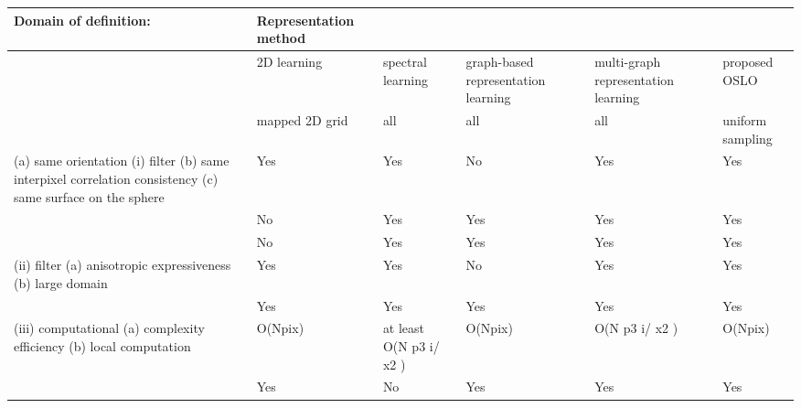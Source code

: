 \begin{tabular}{llllll}
\toprule
Domain of definition: & Representation method &  &  &  &  \\
\midrule
 & 2D learning & spectral learning & graph-based representation learning & multi-graph representation learning & proposed OSLO \\
 & mapped 2D grid & all & all & all & uniform sampling \\
(a) same orientation (i) filter (b) same interpixel correlation consistency (c) same surface on the sphere & Yes & Yes & No & Yes & Yes \\
 & No & Yes & Yes & Yes & Yes \\
 & No & Yes & Yes & Yes & Yes \\
(ii) filter (a) anisotropic expressiveness (b) large domain & Yes & Yes & No & Yes & Yes \\
 & Yes & Yes & Yes & Yes & Yes \\
(iii) computational (a) complexity efficiency (b) local computation & O(Npix) & at least O(N p3 i/ x2 ) & O(Npix) & O(N p3 i/ x2 ) & O(Npix) \\
 & Yes & No & Yes & Yes & Yes \\
\bottomrule
\end{tabular}
